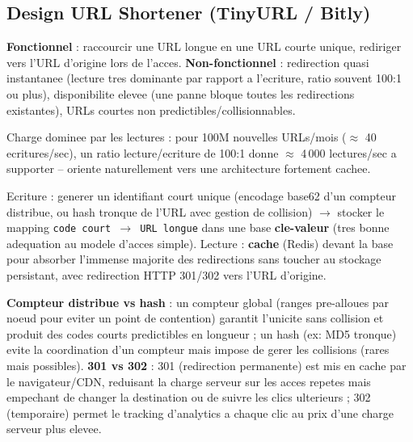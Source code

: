 \documentclass[11pt,a4paper]{article}
\newenvironment{sujet}[1]{%
  \subsection{#1}
}{%
  \bigskip
}
\begin{document}
\begin{sujet}{Design URL Shortener (TinyURL / Bitly)}

\begin{req}
\textbf{Fonctionnel} : raccourcir une URL longue en une URL courte unique, rediriger vers l'URL d'origine lors de l'acces. \textbf{Non-fonctionnel} : redirection quasi instantanee (lecture tres dominante par rapport a l'ecriture, ratio souvent 100:1 ou plus), disponibilite elevee (une panne bloque toutes les redirections existantes), URLs courtes non predictibles/collisionnables.
\end{req}

\begin{estim}
Charge dominee par les lectures : pour 100M nouvelles URLs/mois ($\approx$ 40 ecritures/sec), un ratio lecture/ecriture de 100:1 donne $\approx$ 4\,000 lectures/sec a supporter -- oriente naturellement vers une architecture fortement cachee.
\end{estim}

\begin{archbox}
Ecriture : generer un identifiant court unique (encodage base62 d'un compteur distribue, ou hash tronque de l'URL avec gestion de collision) $\to$ stocker le mapping \texttt{code court $\to$ URL longue} dans une base \textbf{cle-valeur} (tres bonne adequation au modele d'acces simple). Lecture : \textbf{cache} (Redis) devant la base pour absorber l'immense majorite des redirections sans toucher au stockage persistant, avec redirection HTTP 301/302 vers l'URL d'origine.
\end{archbox}

\begin{tradeoff}
\textbf{Compteur distribue vs hash} : un compteur global (ranges pre-alloues par noeud pour eviter un point de contention) garantit l'unicite sans collision et produit des codes courts predictibles en longueur ; un hash (ex: MD5 tronque) evite la coordination d'un compteur mais impose de gerer les collisions (rares mais possibles). \textbf{301 vs 302} : 301 (redirection permanente) est mis en cache par le navigateur/CDN, reduisant la charge serveur sur les acces repetes mais empechant de changer la destination ou de suivre les clics ulterieurs ; 302 (temporaire) permet le tracking d'analytics a chaque clic au prix d'une charge serveur plus elevee.
\end{tradeoff}

\end{sujet}
\end{document}
